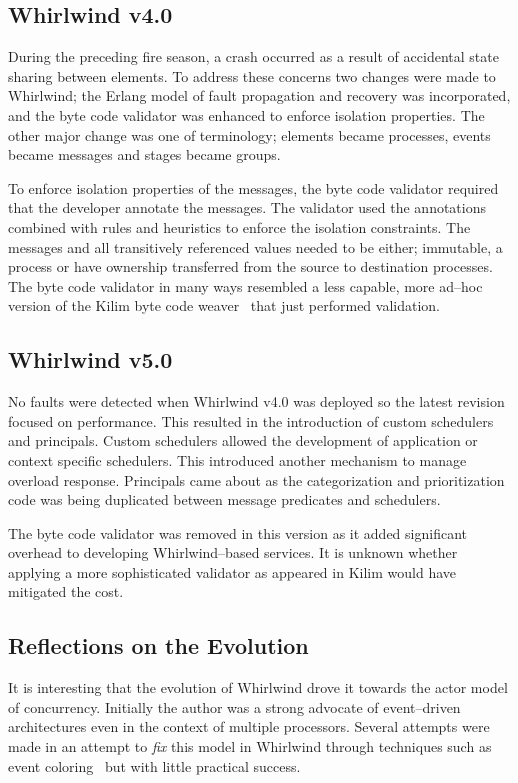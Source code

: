 \documentclass[conference]{IEEEtran}
\begin{document}
\subsection{Whirlwind v4.0}

During the preceding fire season, a crash occurred as a result of accidental state sharing between elements. To address these concerns two changes were made to Whirlwind; the Erlang model of fault propagation and recovery was incorporated, and the byte code validator was enhanced to enforce isolation properties. The other major change was one of terminology; elements became processes, events became messages and stages became groups.

To enforce isolation properties of the messages, the byte code validator required that the developer annotate the messages. The validator used the annotations combined with rules and heuristics to enforce the isolation constraints. The messages and all transitively referenced values needed to be either; immutable, a process or have ownership transferred from the source to destination processes. The byte code validator in many ways resembled a less capable, more ad--hoc version of the Kilim byte code weaver~\cite{Srinivasan:08:Kilim} that just performed validation.

\subsection{Whirlwind v5.0}

No faults were detected when Whirlwind v4.0 was deployed so the latest revision focused on performance. This resulted in the introduction of custom schedulers and principals. Custom schedulers allowed the development of application or context specific schedulers. This introduced another mechanism to manage overload response. Principals came about as the categorization and prioritization code was being duplicated between message predicates and schedulers.

The byte code validator was removed in this version as it added significant overhead to developing Whirlwind--based services. It is unknown whether applying a more sophisticated validator as appeared in Kilim would have mitigated the cost.

\subsection{Reflections on the Evolution}

It is interesting that the evolution of Whirlwind drove it towards the actor model of concurrency. Initially the author was a strong advocate of event--driven architectures even in the context of multiple processors. Several attempts were made in an attempt to \emph{fix} this model in Whirlwind through techniques such as event coloring~\cite{Dabek02EventDriven} but with little practical success. 
\end{document}
